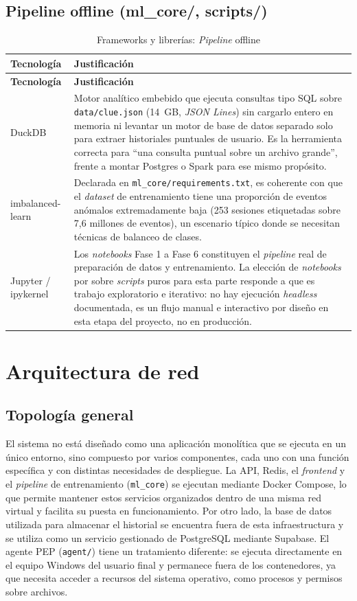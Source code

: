 \subsection{Pipeline offline (ml\_core/, scripts/)}
\begin{longtable}{p{3cm}p{11.6cm}}
	\caption{Frameworks y librerías: \emph{Pipeline} offline}
	\label{tab:frameworks-mlcore}\\
	\hline
	\textbf{Tecnología} & \textbf{Justificación} \\
	\hline
	\endfirsthead
	\hline
	\textbf{Tecnología} & \textbf{Justificación} \\
	\hline
	\endhead
	DuckDB & Motor analítico embebido que ejecuta consultas tipo SQL sobre \texttt{data/clue.json} (14~GB, \emph{JSON Lines}) sin cargarlo entero en memoria ni levantar un motor de base de datos separado solo para extraer historiales puntuales de usuario. Es la herramienta correcta para ``una consulta puntual sobre un archivo grande'', frente a montar Postgres o Spark para ese mismo propósito. \\
	\hline
	imbalanced-learn & Declarada en \texttt{ml\_core/requirements.txt}, es coherente con que el \emph{dataset} de entrenamiento tiene una proporción de eventos anómalos extremadamente baja (253 sesiones etiquetadas sobre 7,6 millones de eventos), un escenario típico donde se necesitan técnicas de balanceo de clases. \\
	\hline
	Jupyter / ipykernel & Los \emph{notebooks} Fase 1 a Fase 6 constituyen el \emph{pipeline} real de preparación de datos y entrenamiento. La elección de \emph{notebooks} por sobre \emph{scripts} puros para esta parte responde a que es trabajo exploratorio e iterativo: no hay ejecución \emph{headless} documentada, es un flujo manual e interactivo por diseño en esta etapa del proyecto, no en producción. \\
	\hline
\end{longtable}

\section{Arquitectura de red}

\subsection{Topología general}
El sistema no está diseñado como una aplicación monolítica que se ejecuta en un único entorno, sino compuesto por varios componentes, cada uno con una función específica y con distintas necesidades de despliegue. La API, Redis, el \emph{frontend} y el \emph{pipeline} de entrenamiento (\texttt{ml\_core}) se ejecutan mediante Docker Compose, lo que permite mantener estos servicios organizados dentro de una misma red virtual y facilita su puesta en funcionamiento. Por otro lado, la base de datos utilizada para almacenar el historial se encuentra fuera de esta infraestructura y se utiliza como un servicio gestionado de PostgreSQL mediante Supabase. El agente PEP (\texttt{agent/}) tiene un tratamiento diferente: se ejecuta directamente en el equipo Windows del usuario final y permanece fuera de los contenedores, ya que necesita acceder a recursos del sistema operativo, como procesos y permisos sobre archivos.

